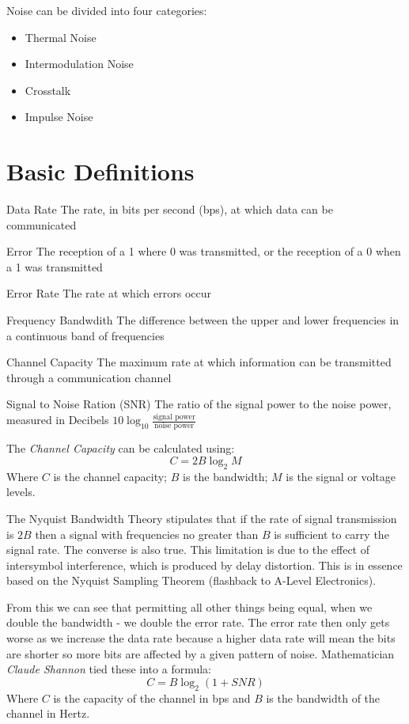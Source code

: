 Noise can be divided into four categories:
\begin{itemize}
    \item Thermal Noise
    \item Intermodulation Noise
    \item Crosstalk
    \item Impulse Noise
\end{itemize}

\section{Basic Definitions}
\begin{define}
\item[Data Rate] The rate, in bits per second (bps), at which data can be communicated
\item[Error] The reception of a 1 where 0 was transmitted, or the reception of a 0 when a 1 was transmitted
\item[Error Rate] The rate at which errors occur
\item[Frequency Bandwdith] The difference between the upper and lower frequencies in a continuous band of frequencies
\item[Channel Capacity] The maximum rate at which information can be transmitted through a communication channel
\item[Signal to Noise Ration (SNR)] The ratio of the signal power to the noise power, measured in Decibels $\displaystyle 10\log_{10} \frac{\textrm{signal\ power}}{\textrm{noise\ power}}$
\end{define}

The \textit{Channel Capacity} can be calculated using:
\[C = 2B \log_2M\]
Where $C$ is the channel capacity; $B$ is the bandwidth; $M$ is the signal or voltage levels. 

The Nyquist Bandwidth Theory stipulates that if the rate of signal transmission is $2B$ then a signal with frequencies no greater than $B$ is sufficient to carry the signal rate. The converse is also true. This limitation is due to the effect of intersymbol interference, which is produced by delay distortion. This is in essence based on the Nyquist Sampling Theorem (flashback to A-Level Electronics). 

From this we can see that permitting all other things being equal, when we double the bandwidth - we double the error rate. The error rate then only gets worse as we increase the data rate because a higher data rate will mean the bits are shorter so more bits are affected by a given pattern of noise. Mathematician \textit{Claude Shannon} tied these into a formula:
\[C = B \log_2 (1+ SNR)\]
Where $C$ is the capacity of the channel in bps and $B$ is the bandwidth of the channel in Hertz. 

